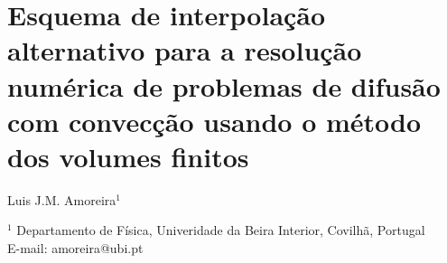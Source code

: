 \documentclass[11pt,twoside]{article}
\begin{document}

\section*{Esquema de interpolação alternativo para a reso\-lução numérica de
problemas de difusão com convecção usando o método dos volumes finitos}

\vspace{10pt}


Luis J.M. Amoreira$^{1}$%

\vspace{10pt}



{
\center

    \footnotesize

$^{1}$ Departamento de Física, Univeridade da Beira Interior, Covilhã,
Portugal\\
E-mail: amoreira@ubi.pt
%
%
%
%

}

\vspace{25pt}

\end{document}
